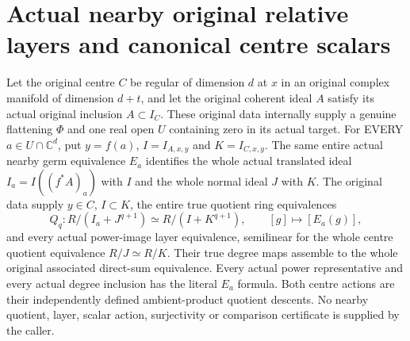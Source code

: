 \section{Actual nearby original relative layers and canonical centre scalars}

\begin{theorem}
\label{hir:nearby-centre-original-canonical-relative-layer-bridge}
\leanok
Let the original centre $C$ be regular of dimension $d$ at $x$ in an
original complex manifold of dimension $d+t$, and let the original
coherent ideal $A$ satisfy its actual original inclusion $A\subset I_C$.
These original data internally supply a genuine flattening $\Phi$ and
one real open $U$ containing zero in its actual target. For EVERY
$a\in U\cap\mathbb C^d$, put $y=f(a)$, $I=I_{A,x,y}$ and
$K=I_{C,x,y}$. The same entire actual nearby germ equivalence $E_a$
identifies the whole actual translated ideal $I_a=I((f^*A)_a)$ with
$I$ and the whole normal ideal $J$ with $K$. The original data supply
$y\in C$, $I\subset K$, the entire true quotient ring equivalences
\[
 Q_q:R/(I_a+J^{q+1})\simeq R/(I+K^{q+1}),
 \qquad [g]\longmapsto[E_a(g)],
\]
and every actual power-image layer equivalence, semilinear for the
whole centre quotient equivalence $R/J\simeq R/K$. Their true degree
maps assemble to the whole original associated direct-sum equivalence.
Every actual power representative and every actual degree inclusion
has the literal $E_a$ formula. Both centre actions are their
independently defined ambient-product quotient descents.
No nearby quotient, layer, scalar action, surjectivity or comparison
certificate is supplied by the caller.
\end{theorem}
